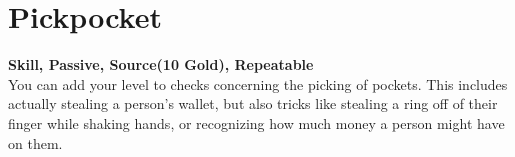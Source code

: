 \section{Pickpocket}\label{sec:pickpocket}
\textbf{Skill, Passive, Source(10 Gold), Repeatable}\\
You can add your level to checks concerning the picking of pockets.
This includes actually stealing a person's wallet, but also tricks like stealing a ring off of their finger while shaking hands, or recognizing  how much money a person might have on them.